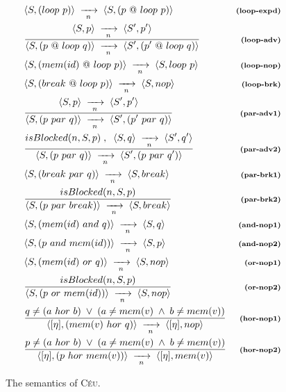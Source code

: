\documentclass{acm_proc_article-sp}
\newcommand{\CEU}{\textsc{C\'{e}u}\xspace}
\newcommand{\ST}{\1\xrightarrow[~n~]{}\1}
\newcommand{\LL}{\langle}
\newcommand{\RR}{\rangle}
\newcommand{\DS}{\displaystyle}
\newcommand{\rr}[1] {{\textbf{\scriptsize{#1}}}}
\newcommand{\1}{\;}
\newcommand{\2}{\;\;}
\newcommand{\3}{\;\;\;}
\newcommand{\5}{\;\;\;\;\;}
\begin{document}
\begin{figure}
{\begin{eqnarray*}
& \LL S, (loop~p) \RR \ST \LL S, (p~@~loop~p) \RR
    & \rr{(loop-expd)}       \\
& \frac
    {\DS \LL S,p \RR \ST \LL S',p' \RR }
    {\DS \LL S, (p~@~loop~q) \RR \ST \LL S', (p'~@~loop~q) \RR }
    & \rr{(loop-adv)}    \\
& \LL S, (mem(id)~@~loop~p) \RR \ST \LL S, loop~p \RR
    & \rr{(loop-nop)}    \\
& \LL S, (break~@~loop~p) \RR \ST \LL S, nop \RR
    & \rr{(loop-brk)}       \\
%
& \frac
    {\DS \LL S,p \RR \ST \LL S',p' \RR }
    {\DS \LL S, (p~par~q) \RR \ST \LL S', (p'~par~q) \RR }
    & \rr{(par-adv1)}      \\
& \frac
    {\DS isBlocked(n,S,p) \1,\2 \LL S,q \RR \ST \LL S',q' \RR }
    {\DS \LL S, (p~par~q) \RR \ST \LL S', (p~par~q') \RR }
    & \rr{(par-adv2)}      \\
& \LL S, (break~par~q) \RR \ST \LL S, break \RR
    & \rr{(par-brk1)}   \\
& \frac
    {\DS isBlocked(n,S,p) }
    {\DS \LL S, (p~par~break) \RR \ST \LL S, break \RR }
    & \rr{(par-brk2)}   \\
%
%
& \LL S, (mem(id)~and~q) \RR \ST \LL S, q \RR
    & \rr{(and-nop1)}   \\
& \LL S, (p~and~mem(id)) \RR \ST \LL S, p \RR
    & \rr{(and-nop2)}   \\
& \LL S, (mem(id)~or~q) \RR \ST \LL S, nop \RR
    & \rr{(or-nop1)}   \\
& \frac
    {\DS isBlocked(n,S,p) }
    {\DS \LL S, (p~or~mem(id)) \RR \ST \LL S, nop \RR }
    & \rr{(or-nop2)}   \\
& \frac
    {\DS q \neq (a~hor~b) \1\vee\1 (a \neq mem(v) \1\wedge\1 b \neq mem(v)) }
    {\DS \LL [\eta], (mem(v)~hor~q) \RR \ST \LL [\eta], nop \RR }
    & \rr{(hor-nop1)}   \\
& \frac
    {\DS p \neq (a~hor~b) \1\vee\1 (a \neq mem(v) \1\wedge\1 b \neq mem(v)) }
    {\DS \LL [\eta], (p~hor~mem(v)) \RR \ST \LL [\eta], mem(v) \RR }
    & \rr{(hor-nop2)}
%
\end{eqnarray*}
}
%
\caption{ The semantics of \CEU.
\label{fig.sem}
}
\end{figure}
\end{document}
